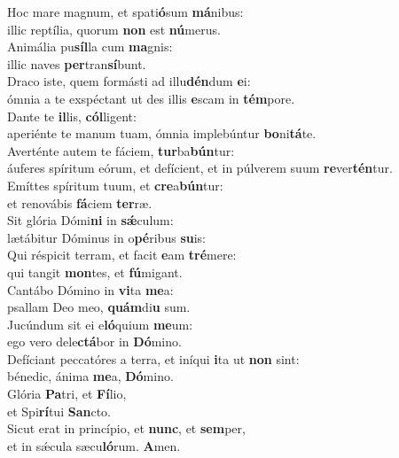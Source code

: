 \evenverse Hoc mare magnum, et spati\textbf{ó}sum \textbf{má}nibus:~\*\\
\evenverse illic reptília, quorum \textbf{non} est \textbf{nú}merus.\\
\oddverse Animália pu\textbf{síl}la cum \textbf{ma}gnis:~\*\\
\oddverse illic naves \textbf{per}tran\textbf{sí}bunt.\\
\evenverse Draco iste, quem formásti ad illu\textbf{dén}dum \textbf{e}i:~\*\\
\evenverse ómnia a te exspéctant ut des illis \textbf{e}scam in \textbf{tém}pore.\\
\oddverse Dante te \textbf{il}lis, \textbf{cól}ligent:~\*\\
\oddverse aperiénte te manum tuam, ómnia implebúntur \textbf{bo}ni\textbf{tá}te.\\
\evenverse Averténte autem te fáciem, \textbf{tur}ba\textbf{bún}tur:~\*\\
\evenverse áuferes spíritum eórum, et defícient, et in púlverem suum \textbf{re}ver\textbf{tén}tur.\\
\oddverse Emíttes spíritum tuum, et \textbf{cre}a\textbf{bún}tur:~\*\\
\oddverse et renovábis \textbf{fá}ciem \textbf{ter}ræ.\\
\evenverse Sit glória Dómi\textbf{ni} in \textbf{sǽ}culum:~\*\\
\evenverse lætábitur Dóminus in o\textbf{pé}ribus \textbf{su}is:\\
\oddverse Qui réspicit terram, et facit \textbf{e}am \textbf{tré}mere:~\*\\
\oddverse qui tangit \textbf{mon}tes, et \textbf{fú}migant.\\
\evenverse Cantábo Dómino in \textbf{vi}ta \textbf{me}a:~\*\\
\evenverse psallam Deo meo, \textbf{quám}di\textbf{u} sum.\\
\oddverse Jucúndum sit ei e\textbf{ló}quium \textbf{me}um:~\*\\
\oddverse ego vero dele\textbf{ctá}bor in \textbf{Dó}mino.\\
\evenverse Defíciant peccatóres a terra, et iníqui \textbf{i}ta ut \textbf{non} sint:~\*\\
\evenverse bénedic, ánima \textbf{me}a, \textbf{Dó}mino.\\
\oddverse Glória \textbf{Pa}tri, et \textbf{Fí}lio,~\*\\
\oddverse et Spi\textbf{rí}tui \textbf{San}cto.\\
\evenverse Sicut erat in princípio, et \textbf{nunc}, et \textbf{sem}per,~\*\\
\evenverse et in sǽcula sæcu\textbf{ló}rum. \textbf{A}men.\\
